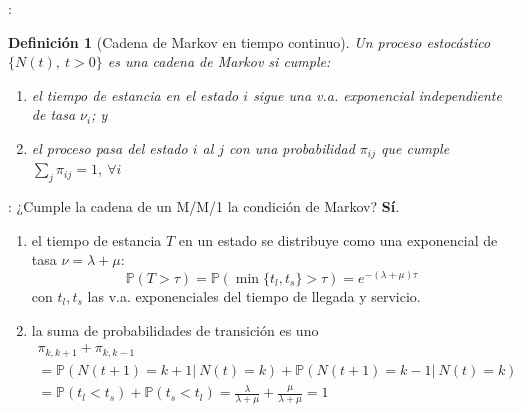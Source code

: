 \documentclass[xcolor={x11names}]{beamer}
\newtheorem{definicion}{Definición}[section]
\begin{document}
\begin{frame}{\secname: \subsecname}
    \begin{definicion}[Cadena de Markov en tiempo continuo\cite{amable}]
        Un proceso estocástico
        $\{N(t),\ t>0\}$ es una cadena de Markov
        si cumple:
        \begin{enumerate}
            \item el tiempo de estancia
                en el estado $i$ sigue
                una v.a. exponencial
                independiente de tasa $\nu_i$; y
            \item el proceso pasa del estado
                $i$ al $j$ con una
                probabilidad $\pi_{ij}$
                que cumple
                $\sum_j \pi_{ij} = 1,\ \forall i$
        \end{enumerate}
    \end{definicion}
\end{frame}




\begin{frame}{\secname: \subsecname}
    ¿Cumple la cadena de un M/M/1 la condición
    de Markov? \pause \textbf{Sí}.

    \vfill

    \begin{enumerate}
        \item el tiempo de estancia $T$ en un
            estado se distribuye como una
            exponencial de tasa
            $\nu=\lambda+\mu$:
            \begin{equation*}
                \mathbb{P}(T>\tau)=\mathbb{P}(\min\{t_l,t_s\}>\tau)=e^{-(\lambda+\mu)\tau}
            \end{equation*}
            con $t_l,t_s$ las v.a.
            exponenciales del tiempo de
            llegada y servicio.

        \item la suma de probabilidades
            de transición es uno
            \begin{multline*}
                \pi_{k,k+1}+\pi_{k,k-1}\\
                =\mathbb{P}(N(t+1)=k+1|\ N(t)=k)
                + \mathbb{P}(N(t+1)=k-1|\ N(t)=k)\\
                = \mathbb{P}(t_l<t_s)
                + \mathbb{P}(t_s<t_l)
                = \frac{\lambda}{\lambda+\mu}
                + \frac{\mu}{\lambda+\mu} = 1
            \end{multline*}
    \end{enumerate}

\end{frame}
\end{document}
